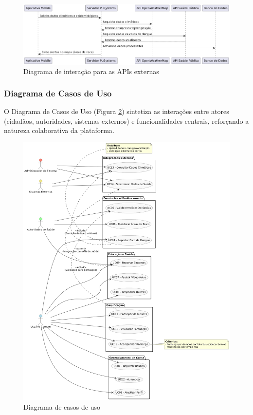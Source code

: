 \documentclass[a4paper, 12pt]{article}
\begin{document}
\begin{figure}[H]
    \centering
    \includegraphics[width=1\textwidth]{dist/Integração com APIs externas.png}
    \caption{Diagrama de interação para as APIs externas}
    \label{fig:apis}
\end{figure}

\subsubsection{Diagrama de Casos de Uso}
O Diagrama de Casos de Uso (Figura \ref{fig:use-case}) sintetiza as interações entre atores (cidadãos, autoridades, sistemas externos) e funcionalidades centrais, reforçando a natureza colaborativa da plataforma.

\begin{figure}[H]
    \centering
    \includegraphics[width=1\textwidth]{dist/Diagrama de casos de uso.png}
    \caption{Diagrama de casos de uso}
    \label{fig:use-case}
\end{figure}
\end{document}
